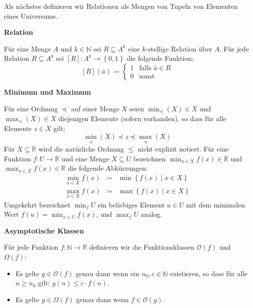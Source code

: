 Als nächstes definieren wir Relationen als Mengen von Tupeln von Elementen
eines Universums. 
\begin{defn}
\textbf{\label{def:relation}Relation}

Für eine Menge $A$ und $k\in\mathbb{N}$ sei $R\subseteq A^{k}$
eine $k$-stellige Relation über $A$. Für jede Relation $R\subseteq A^{k}$
sei $\left[R\right]:A^{k}\rightarrow\left\{ 0,1\right\} $ die folgende
Funktion: 
\[
\left[R\right]\left(\bar{a}\right)\coloneqq\begin{cases}
1 & \mathrm{falls}\,\,\bar{a}\in R\\
0 & \mathrm{sonst}
\end{cases}
\]
\end{defn}
%
\begin{defn}
\textbf{Minimum und Maximum}

Für eine Ordnung $\preceq$ auf einer Menge $X$ seien $\min_{\preceq}\left(X\right)\in X$
und $\max_{\preceq}\left(X\right)\in X$ diejenigen Elemente (sofern
vorhanden), so dass für alle Elemente $z\in X$ gilt:
\[
\min_{\preceq}\left(X\right)\preceq z\preceq\max_{\preceq}\left(X\right)
\]
Für $X\subseteq\mathbb{R}$ wird die natürliche Ordnung $\leqslant$
nicht explizit notiert. Für eine Funktion $f:U\rightarrow\mathbb{R}$
und eine Menge $X\subseteq U$ bezeichnen $\min_{x\in X}f\left(x\right)\in\mathbb{R}$
und $\max_{x\in X}f\left(x\right)\in\mathbb{R}$ die folgende Abkürzungen:
\begin{eqnarray*}
\min_{x\in X}f\left(x\right) & \coloneqq & \min\left\{ f\left(x\right)\mid x\in X\right\} \\
\max_{x\in X}f\left(x\right) & \coloneqq & \max\left\{ f\left(x\right)\mid x\in X\right\} 
\end{eqnarray*}
Umgekehrt bezeichnet $\min_{f}U$ ein beliebiges Element $u\in U$
mit dem minimalen Wert $f\left(u\right)=\min_{x\in U}f\left(x\right)$,
und $\max_{f}U$ analog.
\end{defn}
%
\begin{defn}
\textbf{Asymptotische Klassen}

Für jede Funktion $f:\mathbb{N}\rightarrow\mathbb{R}$ definieren
wir die Funktionsklassen $\mathcal{O}\left(f\right)$ und $\Omega\left(f\right)$:

\end{defn}
\begin{itemize}
\item Es gelte $g\in\mathcal{O}\left(f\right)$ genau dann wenn ein $n_{0},c\in\mathbb{N}$
existieren, so dass für alle $n\geqslant n_{0}$ gilt: $g\left(n\right)\leqslant c\cdot f\left(n\right)$.
\item Es gelte $g\in\Omega\left(f\right)$ genau dann wenn $f\in\mathcal{O}\left(g\right)$.
\end{itemize}
